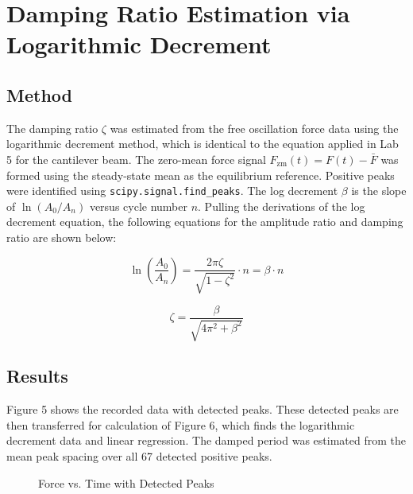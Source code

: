 \documentclass{article}
\begin{document}
\section{Damping Ratio Estimation via Logarithmic Decrement}

\subsection{Method}

The damping ratio $\zeta$ was estimated from the free oscillation force data using the logarithmic decrement method, which is identical to the equation applied in Lab 5 for the cantilever beam. The zero-mean force signal $F_\text{zm}(t) = F(t) - \bar{F}$ was formed using the steady-state mean as the equilibrium reference. Positive peaks were identified using \texttt{scipy.signal.find\_peaks}. The log decrement $\beta$ is the slope of $\ln(A_0/A_n)$ versus cycle number $n$. Pulling the derivations of the log decrement equation, the following equations for the amplitude ratio and damping ratio are shown below:

\begin{equation}
    \ln\!\left(\frac{A_0}{A_n}\right) = \frac{2\pi\zeta}{\sqrt{1-\zeta^2}} \cdot n = \beta \cdot n
    \label{eq:logdec}
\end{equation}

\begin{equation}
    \zeta = \frac{\beta}{\sqrt{4\pi^2 + \beta^2}}
    \label{eq:zeta}
\end{equation}

\subsection{Results}

Figure 5 shows the recorded data with detected peaks. These detected peaks are then transferred for calculation of Figure 6, which finds the logarithmic decrement data and linear regression. The damped period was estimated from the mean peak spacing over all 67 detected positive peaks.

\begin{figure}[H]
    \centering
    \caption{Force vs. Time with Detected Peaks}
    \label{fig:peaks}
\end{figure}
\end{document}
